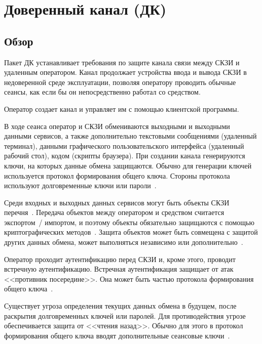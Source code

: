 \section{Доверенный канал (ДК)}\label{TC}

\subsection{Обзор}\label{TC.Intro}

Пакет ДК устанавливает требования по защите канала связи между СКЗИ и 
удаленным оператором. 
%
Канал продолжает устройства ввода и вывода СКЗИ в недоверенной среде 
эксплуатации, позволяя оператору проводить обычные сеансы,
как если бы он непосредственно работал со средством.

Оператор создает канал и управляет им с помощью клиентской программы. 

В ходе сеанса оператор и СКЗИ обмениваются выходными и выходными данными 
сервисов, а также дополнительно текстовыми сообщениями (удаленный терминал),  
данными графического пользовательского интерфейса (удаленный рабочий стол),
кодом (скрипты браузера).
%
При создании канала генерируются ключи, на которых данные обмена защищаются. 
Обычно для генерации ключей используется протокол формирования общего 
ключа. Стороны протокола используют долговременные ключи или 
пароли~.

Среди входных и выходных данных сервисов могут быть объекты СКЗИ 
перечня~. Передача объектов между оператором и средством 
считается экспортом~/ импортом, и поэтому объекты обязательно защищаются с помощью 
криптографических методов~. Защита объектов 
может быть совмещена с защитой других данных обмена, может выполняться 
независимо или дополнительно~.

Оператор проходит аутентификацию перед СКЗИ и, кроме этого, проводит встречную 
аутентификацию. Встречная аутентификация защищает от атак <<противник 
посередине>>. Она может быть частью протокола формирования общего 
ключа~.

Существует угроза определения текущих данных обмена в будущем, после раскрытия 
долговременных ключей или паролей. Для противодействия угрозе обеспечивается 
защита от <<чтения назад>>. Обычно для этого в протокол формирования общего ключа
вводят дополнительные сеансовые ключи~. 

